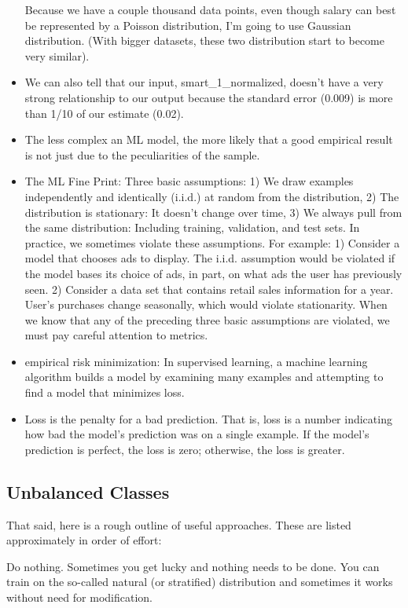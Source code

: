 \documentclass[]{book}
\theoremstyle{definition}
\theoremstyle{definition}
\theoremstyle{definition}
\theoremstyle{remark}
\begin{document}
\begin{itemize}
  Because we have a couple thousand data points, even though salary can
  best be represented by a Poisson distribution, I'm going to use
  Gaussian distribution. (With bigger datasets, these two distribution
  start to become very similar).
\item
  We can also tell that our input, smart\_1\_normalized, doesn't have a
  very strong relationship to our output because the standard error
  (0.009) is more than 1/10 of our estimate (0.02).
\item
  The less complex an ML model, the more likely that a good empirical
  result is not just due to the peculiarities of the sample.
\item
  The ML Fine Print: Three basic assumptions: 1) We draw examples
  independently and identically (i.i.d.) at random from the
  distribution, 2) The distribution is stationary: It doesn't change
  over time, 3) We always pull from the same distribution: Including
  training, validation, and test sets. In practice, we sometimes violate
  these assumptions. For example: 1) Consider a model that chooses ads
  to display. The i.i.d. assumption would be violated if the model bases
  its choice of ads, in part, on what ads the user has previously seen.
  2) Consider a data set that contains retail sales information for a
  year. User's purchases change seasonally, which would violate
  stationarity. When we know that any of the preceding three basic
  assumptions are violated, we must pay careful attention to metrics.
\item
  empirical risk minimization: In supervised learning, a machine
  learning algorithm builds a model by examining many examples and
  attempting to find a model that minimizes loss.
\item
  Loss is the penalty for a bad prediction. That is, loss is a number
  indicating how bad the model's prediction was on a single example. If
  the model's prediction is perfect, the loss is zero; otherwise, the
  loss is greater.
\end{itemize}

\subsection{Unbalanced Classes}\label{unbalanced-classes}

That said, here is a rough outline of useful approaches. These are
listed approximately in order of effort:

Do nothing. Sometimes you get lucky and nothing needs to be done. You
can train on the so-called natural (or stratified) distribution and
sometimes it works without need for modification.
\end{document}
